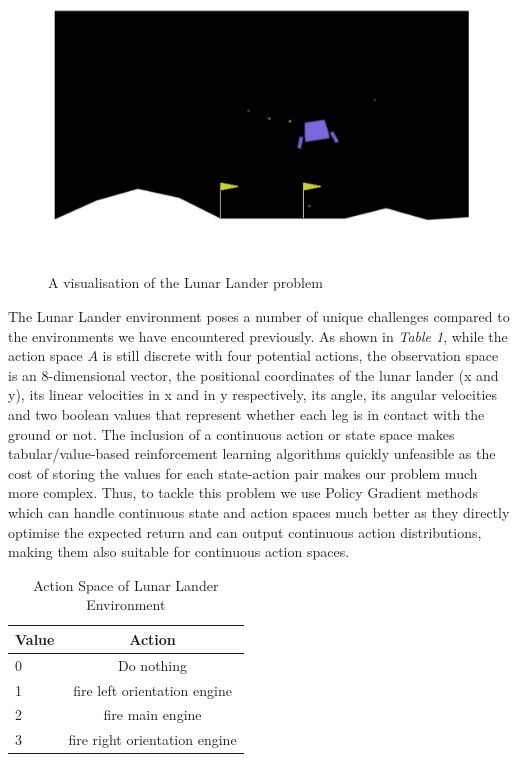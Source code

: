 \documentclass{article}
\begin{document}
\begin{figure}[htbp]
\centering
\includegraphics[width=0.7\linewidth]{Report/images/visualisation.png}
\caption{\label{fig:Visualization of the Cart-pole} A visualisation of the Lunar Lander problem}
\end{figure}


The Lunar Lander environment poses a number of unique challenges compared to the environments we have encountered previously. As shown in \emph{Table 1}, while the action space $A$ is still discrete with four potential actions, the observation space is an 8-dimensional vector, the positional coordinates of the lunar lander (x and y), its linear velocities in x and in y respectively, its angle, its angular velocities and two boolean values that represent whether each leg is in contact with the ground or not. The inclusion of a continuous action or state space makes tabular/value-based reinforcement learning algorithms quickly unfeasible as the cost of storing the values for each state-action pair makes our problem much more complex. \newline
Thus, to tackle this problem we use Policy Gradient methods which can handle continuous state and action spaces much better as they directly optimise the expected return and can output continuous action distributions, making them also suitable for continuous action spaces.

\begin{table}[htbp]
\centering
\begin{tabular}{|l|c|}
\hline
\textbf{Value} & \textbf{Action} \\
\hline
0  & Do nothing \\
\hline
1 & fire left orientation engine \\
\hline
2  & fire main engine \\
\hline
3 & fire right orientation engine  \\
\hline
\end{tabular}
\caption{Action Space of Lunar Lander Environment}
\label{tab:hyper-parameters}
\end{table}
\end{document}
